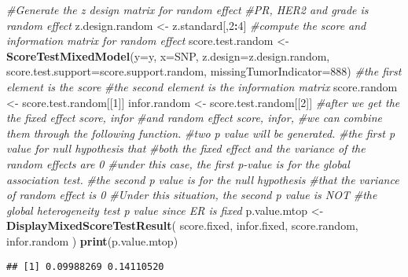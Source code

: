 \documentclass[11pt,]{article}
\newenvironment{Shaded}{\begin{snugshade}}{\end{snugshade}}
\newcommand{\KeywordTok}[1]{\textcolor[rgb]{0.13,0.29,0.53}{\textbf{#1}}}
\newcommand{\DataTypeTok}[1]{\textcolor[rgb]{0.13,0.29,0.53}{#1}}
\newcommand{\DecValTok}[1]{\textcolor[rgb]{0.00,0.00,0.81}{#1}}
\newcommand{\StringTok}[1]{\textcolor[rgb]{0.31,0.60,0.02}{#1}}
\newcommand{\CommentTok}[1]{\textcolor[rgb]{0.56,0.35,0.01}{\textit{#1}}}
\newcommand{\OperatorTok}[1]{\textcolor[rgb]{0.81,0.36,0.00}{\textbf{#1}}}
\newcommand{\NormalTok}[1]{#1}
\begin{document}
\begin{Shaded}
\begin{Highlighting}[]
\CommentTok{#Generate the z design matrix for random effect}
\CommentTok{#PR, HER2 and grade is random effect}
\NormalTok{z.design.random <-}\StringTok{ }\NormalTok{z.standard[,}\DecValTok{2}\OperatorTok{:}\DecValTok{4}\NormalTok{]}
\CommentTok{#compute the score and information matrix for random effect}
\NormalTok{score.test.random <-}\StringTok{ }\KeywordTok{ScoreTestMixedModel}\NormalTok{(}\DataTypeTok{y=}\NormalTok{y,}
                                         \DataTypeTok{x=}\NormalTok{SNP,}
                                         \DataTypeTok{z.design=}\NormalTok{z.design.random,}
                                         \DataTypeTok{score.test.support=}\NormalTok{score.support.random,}
                                         \DataTypeTok{missingTumorIndicator=}\DecValTok{888}\NormalTok{)}
\CommentTok{#the first element is the score}
\CommentTok{#the second element is the information matrix}
\NormalTok{score.random <-}\StringTok{ }\NormalTok{score.test.random[[}\DecValTok{1}\NormalTok{]]}
\NormalTok{infor.random <-}\StringTok{ }\NormalTok{score.test.random[[}\DecValTok{2}\NormalTok{]]}
\CommentTok{#after we get the the fixed effect score, infor }
\CommentTok{#and random effect score, infor, }
\CommentTok{#we can combine them through the following function. }
\CommentTok{#two p value will be generated.}
\CommentTok{#the first p value for null hypothesis that}
\CommentTok{#both the fixed effect and the variance of the random effects are 0}
\CommentTok{#under this case, the first p-value is for the global association test.}
\CommentTok{#the second p value is for the null hypothesis }
\CommentTok{#that the variance of random effect is 0}
\CommentTok{#Under this situation, the second p value is NOT }
\CommentTok{#the global heterogeneity test p value since ER is fixed}
\NormalTok{p.value.mtop <-}\StringTok{ }\KeywordTok{DisplayMixedScoreTestResult}\NormalTok{(}
\NormalTok{  score.fixed,}
\NormalTok{  infor.fixed,}
\NormalTok{  score.random,}
\NormalTok{  infor.random}
\NormalTok{)  }
\KeywordTok{print}\NormalTok{(p.value.mtop)}
\end{Highlighting}
\end{Shaded}

\begin{verbatim}
## [1] 0.09988269 0.14110520
\end{verbatim}
\end{document}
